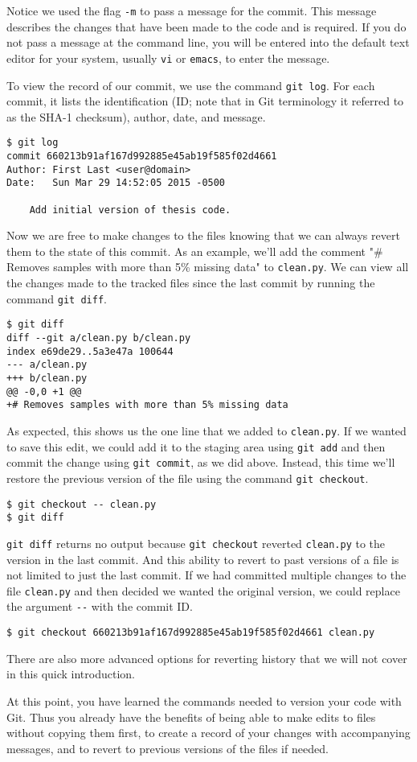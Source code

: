 Notice we used the flag \verb|-m| to pass a message for the commit.
This message describes the changes that have been made to the code and is required.
If you do not pass a message at the command line, you will be entered into the default text editor for your system, usually \verb|vi| or \verb|emacs|, to enter the message.

To view the record of our commit, we use the command \verb|git log|.
For each commit, it lists the identification (ID; note that in Git terminology it referred to as the SHA-1 checksum), author, date, and message.

\begin{lstlisting}
$ git log
commit 660213b91af167d992885e45ab19f585f02d4661
Author: First Last <user@domain>
Date:   Sun Mar 29 14:52:05 2015 -0500

    Add initial version of thesis code.
\end{lstlisting}

Now we are free to make changes to the files knowing that we can always revert them to the state of this commit.
As an example, we'll add the comment "\# Removes samples with more than 5\% missing data" to \verb|clean.py|.
We can view all the changes made to the tracked files since the last commit by running the command \verb|git diff|.

\begin{lstlisting}
$ git diff
diff --git a/clean.py b/clean.py
index e69de29..5a3e47a 100644
--- a/clean.py
+++ b/clean.py
@@ -0,0 +1 @@
+# Removes samples with more than 5% missing data
\end{lstlisting}

As expected, this shows us the one line that we added to \verb|clean.py|.
If we wanted to save this edit, we could add it to the staging area using \verb|git add| and then commit the change using \verb|git commit|, as we did above.
Instead, this time we'll restore the previous version of the file using the command \verb|git checkout|.

\begin{lstlisting}
$ git checkout -- clean.py
$ git diff
\end{lstlisting}

\verb|git diff| returns no output because \verb|git checkout| reverted \verb|clean.py| to the version in the last commit.
And this ability to revert to past versions of a file is not limited to just the last commit.
If we had committed multiple changes to the file \verb|clean.py| and then decided we wanted the original version, we could replace the argument \verb|--| with the commit ID.

\begin{lstlisting}
$ git checkout 660213b91af167d992885e45ab19f585f02d4661 clean.py
\end{lstlisting}

There are also more advanced options for reverting history that we will not cover in this quick introduction.

At this point, you have learned the commands needed to version your code with Git.
Thus you already have the benefits of being able to make edits to files without copying them first, to create a record of your changes with accompanying messages, and to revert to previous versions of the files if needed.